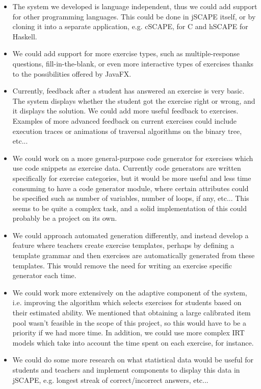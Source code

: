 \begin{itemize}
\item The system we developed is language independent, thus we could add support for other programming languages. This could be done in jSCAPE itself, or by cloning it into a separate application, e.g.  cSCAPE, for C and hSCAPE for Haskell.
\item We could add support for more exercise types, such as multiple-response questions, fill-in-the-blank, or even more interactive types of exercises thanks to the possibilities offered by \textsf{JavaFX}.
\item Currently, feedback after a student has answered an exercise is very basic. The system displays whether the student got the exercise right or wrong, and it displays the solution. We could add more useful feedback to exercises. Examples of more advanced feedback on current exercises could include execution traces or animations of traversal algorithms on the binary tree, etc...
\item We could work on a more general-purpose code generator for exercises which use code snippets as exercise data. Currently code generators are written specifically for exercise categories, but it would be more useful and less time consuming to have a code generator module, where certain attributes could be specified such as number of variables, number of loops, if any, etc... This seems to be quite a complex task, and a solid implementation of this could probably be a project on its own.
\item We could approach automated generation differently, and instead develop a feature where teachers create exercise templates, perhaps by defining a template grammar and then exercises are automatically generated from these templates. This would remove the need for writing an exercise specific generator each time.
\item We could work more extensively on the adaptive component of the system, i.e. improving the algorithm which selects exercises for students based on their estimated ability. We mentioned that obtaining a large calibrated item pool wasn't feasible in the scope of this project, so this would have to be a priority if we had more time. In addition, we could use more complex IRT models which take into account the time spent on each exercise, for instance.
\item We could do some more research on what statistical data would be useful for students and teachers and implement components to display this data in jSCAPE, e.g. longest streak of correct/incorrect answers, etc...
\end{itemize}